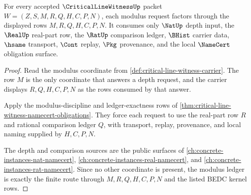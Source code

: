 \begin{theorem}
\label{thm:critical-line-witness-root-unblock-modulus-ledger}
For every accepted $\CriticalLineWitnessUp$ packet $W=(Z,S,M,R,Q,H,C,P,N)$, each modulus request factors through the displayed rows $M,R,Q,H,C,P,N$. It consumes only $\NatUp$ depth input, the $\RealUp$ real-part row, the $\RatUp$ comparison ledger, $\BHist$ carrier data, $\hsame$ transport, $\Cont$ replay, $\Pkg$ provenance, and the local $\NameCert$ obligation surface.
\end{theorem}
\begin{proof}
Read the modulus coordinate from \autoref{def:critical-line-witness-carrier}. The row $M$ is the only coordinate that answers a depth request, and the carrier displays $R,Q,H,C,P,N$ as the rows consumed by that answer.

Apply the modulus-discipline and ledger-exactness rows of \autoref{thm:critical-line-witness-namecert-obligations}. They force each request to use the real-part row $R$ and rational comparison ledger $Q$, with transport, replay, provenance, and local naming supplied by $H,C,P,N$.

The depth and comparison sources are the public surfaces of \autoref{ch:concrete-instances-nat-namecert}, \autoref{ch:concrete-instances-real-namecert}, and \autoref{ch:concrete-instances-rat-namecert}. Since no other coordinate is present, the modulus ledger is exactly the finite route through $M,R,Q,H,C,P,N$ and the listed BEDC kernel rows.
\end{proof}

